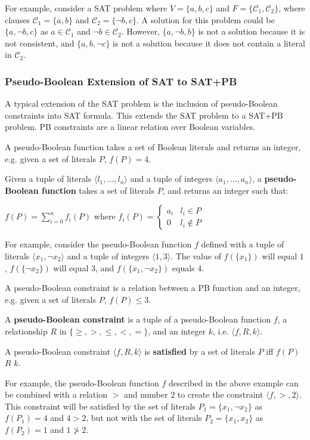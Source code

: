 For example, consider a SAT problem where $V = \{a,b,c\}$ and $F = \{\mathcal{C}_1,\mathcal{C}_2\}$, where clauses $\mathcal{C}_1 = \{a,b\}$ and $\mathcal{C}_2 = \{\neg b, c\}$.
A solution for this problem could be $\{a,\neg b,c\}$ as $a \in \mathcal{C}_1$ and $\neg b \in \mathcal{C}_2$.
However, $\{a, \neg b, b\}$ is not a solution because it is not consistent, and $\{a, b, \neg c\}$ is not a solution because it does not contain a literal in $\mathcal{C}_2$.  


\subsubsection{Pseudo-Boolean Extension of SAT to SAT+PB}
A typical extension of the SAT problem is the inclusion of pseudo-Boolean constraints \citep{dixon2004automating} into SAT formula.
This extends the SAT problem to a SAT+PB problem.
PB constraints are a linear relation over Boolean variables.

A pseudo-Boolean function takes a set of Boolean literals and returns an integer, e.g. given a set of literals $P$, $f(P) = 4$.
\begin{defs}
\label{impl.PBfunction}
Given a tuple of literals $\langle l_1,\ldots,l_n \rangle$ and a tuple of integers $\langle a_1,\ldots,a_n\rangle$,
a \textbf{pseudo-Boolean function} takes a set of literals $P$, and returns an integer such that:

$f(P) = \sum \limits_{i=0}^n f_i(P)$
where $f_i(P) = \begin{cases} a_i & l_i \in P \\ 0 & l_i \not \in P \end{cases}$
\end{defs}
For example, consider the pseudo-Boolean function $f$ defined with a tuple of literals $\langle x_1, \neg x_2\rangle$ and a tuple of integers $\langle 1,3\rangle$.
The value of $f(\{x_1\})$ will equal $1$, $f(\{\neg x_2\})$ will equal $3$, and $f(\{x_1,\neg x_2\})$ equals $4$.

A pseudo-Boolean constraint is a relation between a PB function and an integer, e.g. given a set of literals $P$, $f(P) \leq 3$.
\begin{defs}
\label{impl.PBConstraint}
A \textbf{pseudo-Boolean constraint} is a tuple of a pseudo-Boolean function $f$, a relationship  $R$ in $\{\geq,>,\leq,<,=\}$, and an integer $k$, i.e. $\langle f,R,k\rangle$.
\end{defs}

\begin{defs}
A pseudo-Boolean constraint $\langle f,R,k\rangle$ is \textbf{satisfied} by a set of literals $P$ iff $ f(P)$ $R$ $k$.
\end{defs}
For example, the pseudo-Boolean function $f$ described in the above example can be combined with a relation $>$ and number $2$ to create the constraint $\langle f, >, 2 \rangle$.  
This constraint will be satisfied by the set of literals $P_1 = \{ x_1, \neg x_2 \}$ as $f(P_1) = 4$ and $4 > 2$, 
but not with the set of literals $P_2 = \{ x_1,  x_2 \}$ as $f(P_2) = 1$  and $ 1 \not > 2$.

